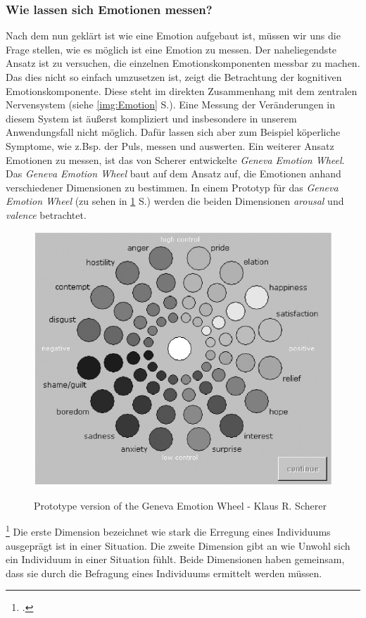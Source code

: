 \subsubsection{Wie lassen sich Emotionen messen?}
Nach dem nun geklärt ist wie eine Emotion aufgebaut ist, müssen wir uns die Frage stellen, wie es möglich ist eine Emotion zu messen. Der naheliegendste Ansatz ist zu versuchen, die einzelnen Emotionskomponenten messbar zu machen. Das dies nicht so einfach umzusetzen ist, zeigt die Betrachtung der kognitiven Emotionskomponente. Diese steht im direkten Zusammenhang mit dem zentralen Nervensystem (siehe \ref{img:Emotion} S.\pageref{img:Emotion}). Eine Messung der Veränderungen in diesem System ist äußerst kompliziert und insbesondere in unserem Anwendungsfall nicht möglich. Dafür lassen sich aber zum Beispiel köperliche Symptome, wie z.Bsp. der Puls, messen und auswerten.\newline
Ein weiterer Ansatz Emotionen zu messen, ist das von Scherer entwickelte \textit{Geneva Emotion Wheel}. Das \textit{Geneva Emotion Wheel} baut auf dem Ansatz auf, die Emotionen anhand verschiedener Dimensionen zu bestimmen. In einem Prototyp für das \textit{Geneva Emotion Wheel} (zu sehen in \ref{img:Geneva} S.\pageref{img:Geneva}) werden die beiden Dimensionen \textit{arousal} und \textit{valence} betrachtet.
\begin{figure}[h]
	\centering
	\includegraphics[width=12cm]{Bilder/Geneva-Emotion-Wheel.png}
	\label{img:Geneva}
	\caption[Prototype version of the Geneva Emotion Wheel - Klaus R. Scherer]{Prototype version of the Geneva Emotion Wheel - Klaus R. Scherer\footnotemark}
\end{figure}%
\footcitetext[Vgl.][S.723 Figure 2]{Kla05}
Die erste Dimension bezeichnet wie stark die Erregung eines Individuums ausgeprägt ist in einer Situation. Die zweite Dimension gibt an wie Unwohl sich ein Individuum in einer Situation fühlt. Beide Dimensionen haben gemeinsam, dass sie durch die Befragung eines Individuums ermittelt werden müssen.
